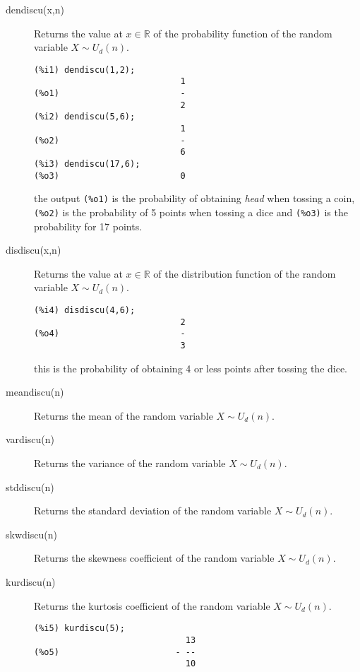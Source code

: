 \documentclass[12pt,a4paper]{article}
\newcommand{\R}{\mathbb{R}}
\begin{document}
\begin{description}

\item[dendiscu(x,n)] Returns the value at $x \in \R$ of the probability function of the random variable $X \sim U_d(n)$.

\begin{verbatim}
(%i1) dendiscu(1,2);
                             1
(%o1)                        -
                             2
(%i2) dendiscu(5,6);
                             1
(%o2)                        -
                             6
(%i3) dendiscu(17,6);
(%o3)                        0
\end{verbatim}
the output \verb|(%o1)| is the probability of obtaining \emph{head} when tossing a coin, \verb|(%o2)| is the probability of 5 points when tossing a dice and \verb|(%o3)| is the probability for 17 points.

\item[disdiscu(x,n)] Returns the value at $x \in \R$ of the distribution function of the random variable $X \sim U_d(n)$.

\begin{verbatim}
(%i4) disdiscu(4,6);
                             2
(%o4)                        -
                             3
\end{verbatim}
this is the probability of obtaining 4 or less points after tossing the dice.

\item[meandiscu(n)] Returns the mean of the random variable  $X \sim U_d(n)$.

\item[vardiscu(n)] Returns the variance of the random variable  $X \sim U_d(n)$.

\item[stddiscu(n)] Returns the standard deviation of the random variable  $X \sim U_d(n)$.

\item[skwdiscu(n)] Returns the skewness coefficient of the random variable  $X \sim U_d(n)$.

\item[kurdiscu(n)] Returns the kurtosis coefficient of the random variable $X \sim U_d(n)$.

\begin{verbatim}
(%i5) kurdiscu(5);
                              13
(%o5)                       - --
                              10
\end{verbatim}

\end{description}
\end{document}
